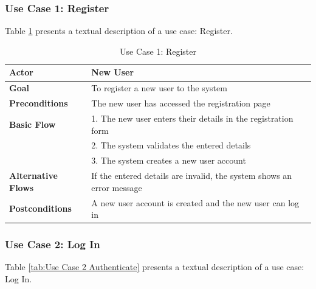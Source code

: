 \subsubsection{Use Case 1: Register}

Table \ref{tab:Use Case 1 Register} presents a textual description of a use case: Register.

\begin{table}[ht]
	\centering
	\begin{tabularx}{\textwidth}{|l|X|}
		\hline
		\textbf{Actor}             & New User                                                              \\
		\hline
		\textbf{Goal}              & To register a new user to the system                                  \\
		\hline
		\textbf{Preconditions}     & The new user has accessed the registration page                       \\
		\hline
		\textbf{Basic Flow}        & 1. The new user enters their details in the registration form         \\
		                           & 2. The system validates the entered details                           \\
		                           & 3. The system creates a new user account                              \\
		\hline
		\textbf{Alternative Flows} & If the entered details are invalid, the system shows an error message \\
		\hline
		\textbf{Postconditions}    & A new user account is created and the new user can log in             \\
		\hline
	\end{tabularx}
	\caption{Use Case 1: Register}
	\label{tab:Use Case 1 Register}
\end{table}

\subsubsection{Use Case 2: Log In}

Table \ref{tab:Use Case 2 Authenticate} presents a textual description of a use case: Log In.

